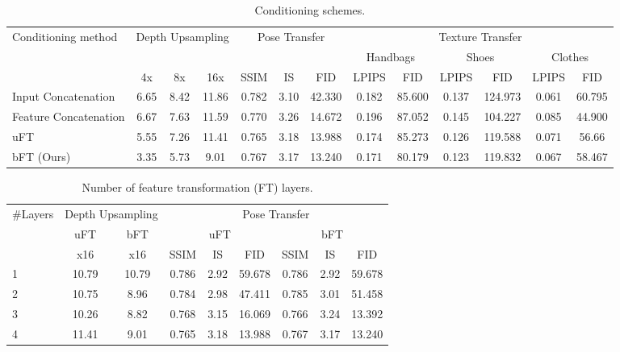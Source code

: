 \documentclass[10pt,twocolumn,letterpaper]{article}
\newlength\tabmargin
\begin{document}
\begin{table*}[htbp]\setlength{\tabcolsep}{3pt}
	\centering\footnotesize
    \caption{Conditioning schemes. }\label{tab:conditioning}
    \begin{tabular}{l|cccccccccccc}
		\toprule
		Conditioning method & \multicolumn{3}{c}{Depth Upsampling}  & \multicolumn{3}{c}{Pose Transfer} & \multicolumn{6}{c}{Texture Transfer}\\
		& & & & & & & \multicolumn{2}{c}{Handbags} & \multicolumn{2}{c}{Shoes} & \multicolumn{2}{c}{Clothes} \\
		                    & 4x &  8x & 16x                        & SSIM &  IS & FID & LPIPS & FID & LPIPS & FID & LPIPS & FID\\
		\midrule
        Input Concatenation     & 6.65 & 8.42 & 11.86               & 0.782 &  3.10 & 42.330 & 0.182 & 85.600 & 0.137 & 124.973 & 0.061 & 60.795\\
        Feature Concatenation   & 6.67 & 7.63 & 11.59               & 0.770 &  3.26 & 14.672 & 0.196 & 87.052 & 0.145 & 104.227 & 0.085 & 44.900\\
        uFT                     & 5.55 & 7.26 & 11.41               & 0.765 &  3.18 & 13.988 & 0.174 & 85.273 & 0.126 & 119.588 & 0.071 & 56.66\\
        bFT (Ours)              & 3.35 & 5.73 & 9.01                & 0.767 &  3.17 & 13.240 & 0.171 & 80.179 & 0.123 & 119.832 & 0.067 & 58.467\\
        \bottomrule
	\end{tabular}
\vspace{\tabmargin}
\end{table*}

\begin{table}[htbp]\setlength{\tabcolsep}{2pt}
	\centering\footnotesize
    \caption{Number of feature transformation (FT) layers.}\label{tab:layers}
    \begin{tabular}{l|cccccccc}
		\toprule
		\#Layers & \multicolumn{2}{c}{Depth Upsampling} & \multicolumn{6}{c}{Pose Transfer}\\
		       & uFT & bFT &\multicolumn{3}{c}{uFT}&  \multicolumn{3}{c}{bFT}\\
		       &  x16   &  x16   &     SSIM & IS & FID  &     SSIM & IS & FID \\
		\midrule
        1  & 10.79 & 10.79              & 0.786 & 2.92 & 59.678 &  0.786 & 2.92 & 59.678\\
        2 & 10.75 & 8.96                & 0.784 & 2.98 & 47.411 &  0.785 & 3.01 & 51.458\\
        3 & 10.26 & 8.82                & 0.768 & 3.15 & 16.069&  0.766 & 3.24 & 13.392\\
        4 & 11.41 & 9.01                & 0.765 & 3.18 & 13.988 &  0.767 & 3.17 & 13.240\\
        \bottomrule
	\end{tabular}
	\vspace{\tabmargin}
  \end{table}
\end{document}
